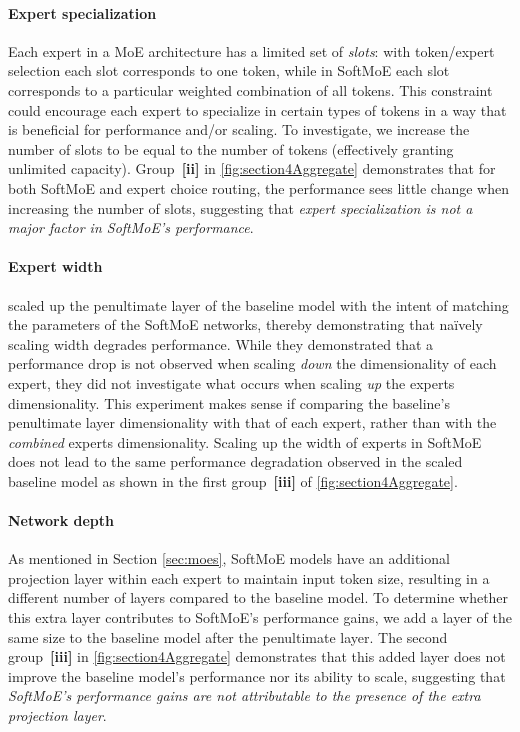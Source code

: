\documentclass{article} %
\begin{document}
\paragraph{Expert specialization} 
Each expert in a MoE architecture has a limited set of {\em slots}: with token/expert selection each slot corresponds to one token, while in SoftMoE each slot corresponds to a particular weighted combination of all tokens. This constraint could encourage each expert to specialize in certain types of tokens in a way that is beneficial for performance and/or scaling. To investigate, we increase the number of slots to be equal to the number of tokens (effectively granting unlimited capacity).
Group~{\bf [ii]} in \autoref{fig:section4Aggregate} demonstrates that for both SoftMoE and expert choice routing, the performance sees little change when increasing the number of slots, suggesting that {\em expert specialization is not a major factor in SoftMoE's performance}.






\paragraph{Expert width} \citet{ceron2024mixtures} scaled up the penultimate layer of the baseline model with the intent of matching the parameters of the SoftMoE networks, thereby demonstrating that na\"{i}vely scaling width degrades performance. While they demonstrated that a performance drop is not observed when scaling {\em down} the dimensionality of each expert, they did not investigate what occurs when scaling {\em up} the experts dimensionality. This experiment makes sense if comparing the baseline's penultimate layer dimensionality with that of each expert, rather than with the {\em combined} experts dimensionality. Scaling up the width of experts in SoftMoE does not lead to the same performance degradation observed in the scaled baseline model as shown in the first group~{\bf [iii]} of  \autoref{fig:section4Aggregate}.


\paragraph{Network depth} As mentioned in Section \ref{sec:moes}, SoftMoE models have an additional projection layer within each expert to maintain input token size, resulting in a different number of layers compared to the baseline model. To determine whether this extra layer contributes to SoftMoE's performance gains, we add a layer of the same size to the baseline model after the penultimate layer. The second group~{\bf [iii]} in \autoref{fig:section4Aggregate} demonstrates that this added layer does not improve the baseline model's performance nor its ability to scale, suggesting that {\em SoftMoE's performance gains are not attributable to the presence of the extra projection layer}.
\end{document}
